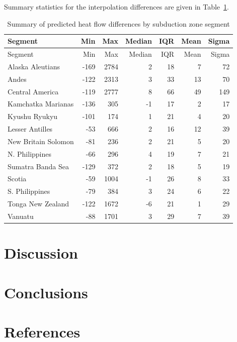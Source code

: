 \documentclass[draft,linenumbers]{agujournal2018}
\begin{document}
Summary statistics for the interpolation differences are given in
Table~\ref{tbl:diff.summary.table}.

\hypertarget{tbl:diff.summary.table}{}
\begin{longtable}[]{@{}lrrrrrr@{}}
\caption{\label{tbl:diff.summary.table}Summary of predicted heat flow
differences by subduction zone segment}\tabularnewline
\toprule
Segment & Min & Max & Median & IQR & Mean & Sigma \\
\midrule
\endfirsthead
\toprule
Segment & Min & Max & Median & IQR & Mean & Sigma \\
\midrule
\endhead
Alaska Aleutians & -169 & 2784 & 2 & 18 & 7 & 72 \\
Andes & -122 & 2313 & 3 & 33 & 13 & 70 \\
Central America & -119 & 2777 & 8 & 66 & 49 & 149 \\
Kamchatka Marianas & -136 & 305 & -1 & 17 & 2 & 17 \\
Kyushu Ryukyu & -101 & 174 & 1 & 21 & 4 & 20 \\
Lesser Antilles & -53 & 666 & 2 & 16 & 12 & 39 \\
New Britain Solomon & -81 & 236 & 2 & 21 & 5 & 20 \\
N. Philippines & -66 & 296 & 4 & 19 & 7 & 21 \\
Sumatra Banda Sea & -129 & 372 & 2 & 18 & 5 & 19 \\
Scotia & -59 & 1004 & -1 & 26 & 8 & 33 \\
S. Philippines & -79 & 384 & 3 & 24 & 6 & 22 \\
Tonga New Zealand & -122 & 1672 & -6 & 21 & 1 & 29 \\
Vanuatu & -88 & 1701 & 3 & 29 & 7 & 39 \\
\bottomrule
\end{longtable}

\section{Discussion}

\section{Conclusions}

\acknowledgments

\clearpage

\section*{References}
\end{document}
